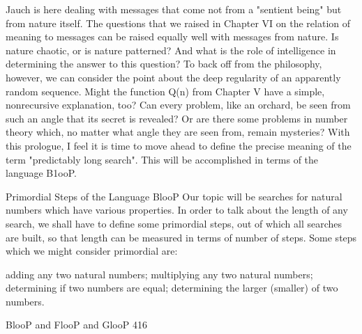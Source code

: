 Jauch is here dealing with messages that come not from a "sentient being" but from
nature itself. The questions that we raised in Chapter VI on the relation of meaning to
messages can be raised equally well with messages from nature. Is nature chaotic, or is
nature patterned? And what is the role of intelligence in determining the answer to this
question?
        To back off from the philosophy, however, we can consider the point about the
deep regularity of an apparently random sequence. Might the function Q(n) from Chapter
V have a simple, nonrecursive explanation, too? Can every problem, like an orchard, be
seen from such an angle that its secret is revealed? Or are there some problems in number
theory which, no matter what angle they are seen from, remain mysteries?
        With this prologue, I feel it is time to move ahead to define the precise meaning
of the term "predictably long search". This will be accomplished in terms of the language
B1ooP.

                   Primordial Steps of the Language BlooP
Our topic will be searches for natural numbers which have various properties. In order to
talk about the length of any search, we shall have to define some primordial steps, out of
which all searches are built, so that length can be measured in terms of number of steps.
Some steps which we might consider primordial are:

    adding any two natural numbers;
    multiplying any two natural numbers;
    determining if two numbers are equal;
    determining the larger (smaller) of two numbers.




BlooP and FlooP and GlooP                                                              416

